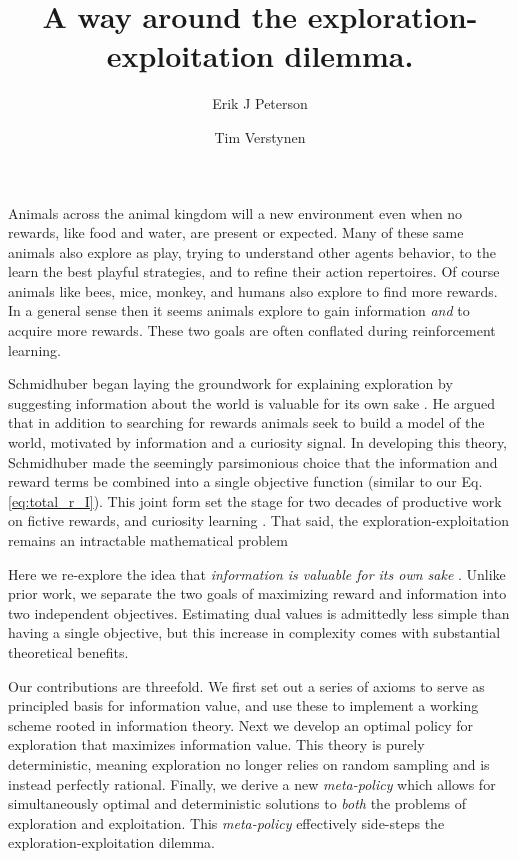 \documentclass[9pt,twocolumn,twoside]{pnas-new}
\title{A way around the exploration-exploitation dilemma.}
\author[a,1]{Erik J Peterson}
\author[a,b]{Tim Verstynen}
\affil[a]{Department of Psychology}
\affil[b]{Center for the Neural Basis of Cognition, Carnegie Mellon University, Pittsburgh PA}
\begin{document}
\verticaladjustment{-2pt}
\maketitle

\thispagestyle{firststyle}
Animals across the animal kingdom will a new environment even when no rewards, like food and water, are present or expected. Many of these same animals also explore as play, trying to understand other agents behavior, to the learn the best playful strategies, and to refine their action repertoires. Of course animals like bees, mice, monkey, and humans also explore to find more rewards. In a general sense then it seems animals explore to gain information \textit{and} to acquire more rewards. These two goals are often conflated during reinforcement learning.

Schmidhuber began laying the groundwork for explaining exploration by suggesting information about the world is valuable for its own sake \cite{Schmidhuber1991}. He argued that in addition to searching for rewards animals seek to build a model of the world, motivated by information and a curiosity signal. In developing this theory, Schmidhuber made the seemingly parsimonious choice that the information and reward terms be combined into a single objective function (similar to our Eq.\ref{eq:total_r_I}). This joint form set the stage for two decades of productive work on fictive rewards, and curiosity learning \cite{Pathak2017,Sutton1990,dayan1996exploration,TODO}. That said, the exploration-exploitation remains an intractable mathematical problem \cite{thrun1992active,dayan1996exploration,findling2018computational,gershman2018deconstructing} 

 Here we re-explore the idea that \textit{information is valuable for its own sake} \cite{Schmidhuber1991}. Unlike prior work, we separate the two goals of maximizing reward and information into two independent objectives. Estimating dual values is admittedly less simple than having a single objective, but this increase in complexity comes with substantial theoretical benefits.

Our contributions are threefold. We first set out a series of axioms to serve as principled basis for information value, and use these to implement a working scheme rooted in information theory. Next we develop an optimal policy for exploration that maximizes information value. This theory is purely deterministic, meaning exploration no longer relies on random sampling and is instead perfectly rational. Finally, we derive a new \textit{meta-policy} which allows for simultaneously optimal and deterministic solutions to \textit{both} the problems of exploration and exploitation. This \textit{meta-policy} effectively side-steps the exploration-exploitation dilemma.
\end{document}
